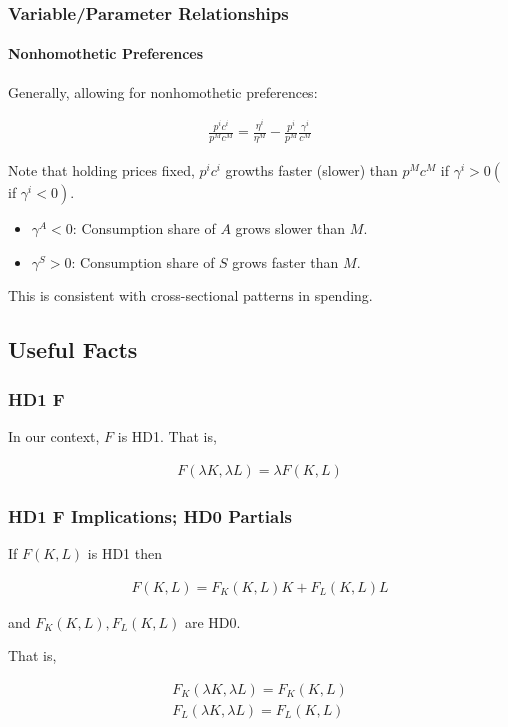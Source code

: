 \documentclass[10pt]{article}
\begin{document}
\subsubsection{Variable/Parameter Relationships}

\paragraph{Nonhomothetic Preferences}

Generally, allowing for nonhomothetic preferences:

\begin{align}
    \frac{p^i c^i}{p^M c^M}=\frac{\eta^i}{\eta^M}-\frac{p^i}{p^M} \frac{\gamma^i}{c^M}
\end{align}

Note that holding prices fixed, $p^i c^i$ growths faster (slower) than $p^M c^M$ if $\gamma^i>0\left(\right.$ if $\left.\gamma^i<0\right)$.

\begin{itemize}
    \item $\gamma^A < 0$: Consumption share of $A$ grows slower than $M$.
    \item $\gamma^S > 0$: Consumption share of $S$ grows faster than $M$.
\end{itemize}

This is consistent with cross-sectional patterns in spending.

\subsection{Useful Facts}

\subsubsection{HD1 F}

In our context, $F$ is HD1. That is,

\begin{align}
    F(\lambda K, \lambda L)=\lambda F(K, L)
\end{align}

\subsubsection{HD1 F Implications; HD0 Partials}

If $F(K, L)$ is HD1 then

\begin{align}
    F(K, L)=F_K(K, L) K+F_L(K, L) L
\end{align}

and $F_K(K, L), F_L(K, L)$ are HD0.

That is,

\begin{align}
    F_K(\lambda K,\lambda L) = F_K(K, L)\\
    F_L(\lambda K,\lambda L) = F_L(K, L)
\end{align}
 
\end{document}

